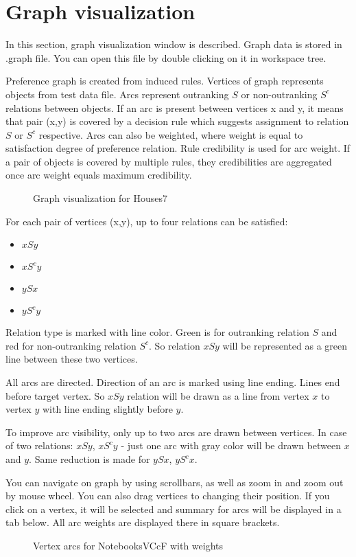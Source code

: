 \section{Graph visualization}\label{section:graph}

In this section, graph visualization window is described. Graph data is stored in .graph file. 
You can open this file by double clicking on it in workspace tree.

Preference graph is created from induced rules. Vertices of graph represents objects from test data file. 
Arcs represent outranking $S$ or non-outranking $S^{c}$ relations between objects. 
If an arc is present between vertices x and y, it means that pair (x,y) is covered by a decision rule which suggests assignment to relation $S$ or $S^{c}$ respective. 
Arcs can also be weighted, where weight is equal to satisfaction degree of preference relation.
Rule credibility is used for arc weight. 
If a pair of objects is covered by multiple rules, they credibilities are aggregated once arc weight equals maximum credibility.

\begin{figure*}[!ht] 
	\centering
	\caption{Graph visualization for Houses7}
\end{figure*}

For each pair of vertices (x,y), up to four relations can be satisfied:
\begin{itemize}
	\item $x S y$
	\item $x S^{c} y$
	\item $y S x$
	\item $y S^{c} y$
\end{itemize}

Relation type is marked with line color. Green is for outranking relation $S$ and red for non-outranking relation $S^{c}$. So relation $x S y$ will be represented as a green line between these two vertices.

All arcs are directed. Direction of an arc is marked using line ending. Lines end before target vertex. So $x S y$ relation will be drawn as a line from vertex $x$ to vertex $y$ with line ending slightly before $y$.

To improve arc visibility, only up to two arcs are drawn between vertices. In case of two relations: $x S y$, $x S^{c} y$ - just one arc with gray color will be drawn between $x$ and $y$. 
Same reduction is made for $y S x$, $y S^{c} x$.

You can navigate on graph by using scrollbars, as well as zoom in and zoom out by mouse wheel. You can also drag vertices to changing their position. If you click on a vertex, it will be selected and summary for arcs will be displayed in a tab below. All arc weights are displayed there in square brackets.

\begin{figure*}[!ht] 
	\centering
	\caption{Vertex arcs for NotebooksVCcF with weights}
\end{figure*}


\vfill\newpage